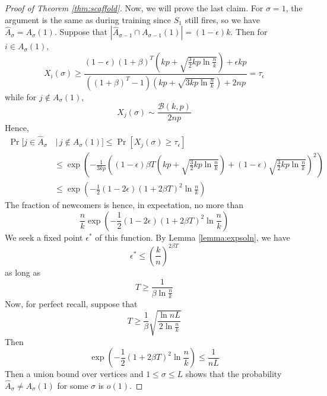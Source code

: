 \documentclass[12pt,nosubfloats]{alt2024} %
\newcommand{\1}{\mathbbm{1}}
\newcommand{\cond}{\, | \,}
\begin{document}
\begin{proof}[Proof of Theorem \ref{thm:scaffold}]
Now, we will prove the last claim. For $\sigma = 1$, the argument is the same as during training since $S_1$ still fires, so we have $\widehat A_\sigma = A_\sigma(1)$. Suppose that $|\widehat A_{\sigma - 1} \cap A_{\sigma-1}(1)| = (1-\epsilon) k$. Then for $i \in A_\sigma(1)$, 
\[X_i(\sigma) \ge \frac{(1 - \epsilon) (1 + \beta)^T (kp + \sqrt{\frac{3}{2}kp \ln \frac{n}{k}}) + \epsilon kp}{((1 + \beta)^T - 1)(kp + \sqrt{3kp \ln \frac{n}{k}}) + 2np} = \tau_\epsilon\]
while for $j \not\in A_\sigma(1)$,
\[X_j(\sigma) \sim \frac{\mathcal B(k, p)}{2np}\]
Hence,
\begin{align*}
    \Pr[j \in \widehat A_\sigma &\cond j \not\in A_\sigma(1)] \le \Pr\left[X_j(\sigma) \ge \tau_\epsilon \right]\\
    &\le \exp\left(-\frac{1}{3kp}\left((1 - \epsilon)\beta T(kp + \sqrt{\frac{3}{2}kp \ln \frac{n}{k}}) + (1 - \epsilon) \sqrt{\frac{3}{2}kp \ln \frac{n}{k}}\right)^2\right)\\
    &\le \exp\left(- \frac{1}{2} (1 - 2\epsilon) (1 + 2\beta T)^2 \ln \frac{n}{k}\right)
\end{align*} The fraction of newcomers is hence, in expectation, no more than
\[\frac{n}{k}\exp\left(- \frac{1}{2}(1 - 2\epsilon) (1 + 2\beta T)^2 \ln \frac{n}{k}\right)\]
We seek a fixed point $\epsilon^*$ of this function. By Lemma \ref{lemma:expsoln}, we have
\[\epsilon^* \le \left(\frac{k}{n}\right)^{2\beta T}\]
as long as
\[T \ge \frac{1}{\beta \ln \frac{n}{k}}\]
Now, for perfect recall, suppose that
\[T  \ge \frac{1}{\beta}\sqrt{\frac{\ln nL}{2\ln \frac{n}{k}}}\]
Then
\[\exp\left(- \frac{1}{2} (1 + 2\beta T)^2 \ln \frac{n}{k}\right) \le \frac{1}{nL}\]
Then a union bound over vertices and $1 \le \sigma \le L$ shows that the probability $\widehat A_\sigma \neq A_\sigma(1)$ for some $\sigma$ is $o(1)$.
\end{proof}
\end{document}
